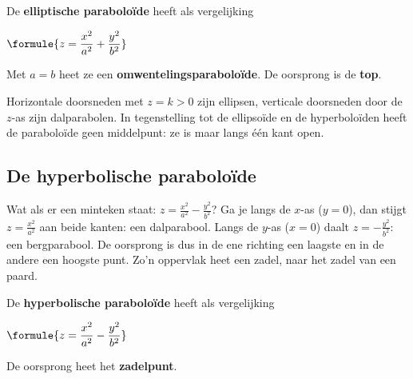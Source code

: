 \begin{theorie}
\begin{minipage}[t]{.68\linewidth}
\vspace{0pt}
De \textbf{\textcolor{accent}{elliptische paraboloïde}} heeft als vergelijking

\vspace{1mm}
\qquad $\formule{z = \dfrac{x^2}{a^2} + \dfrac{y^2}{b^2}}$

\vspace{1mm}
Met $a = b$ heet ze een \textbf{\textcolor{accent}{omwentelingsparaboloïde}}. De oorsprong is de \textbf{\textcolor{accent}{top}}.
\end{minipage}\hfill
\begin{minipage}[t]{.28\linewidth}
\vspace{0pt}
\centering
{}
\end{minipage}
\end{theorie}

Horizontale doorsneden met $z = k > 0$ zijn ellipsen, verticale doorsneden door de $z$-as zijn dalparabolen. In tegenstelling tot de ellipsoïde en de hyperboloïden heeft de paraboloïde geen middelpunt: ze is maar langs één kant open.

\subsection{De hyperbolische paraboloïde}

Wat als er een minteken staat: $z = \tfrac{x^2}{a^2} - \tfrac{y^2}{b^2}$? Ga je langs de $x$-as ($y = 0$), dan stijgt $z = \tfrac{x^2}{a^2}$ aan beide kanten: een dalparabool. Langs de $y$-as ($x = 0$) daalt $z = -\tfrac{y^2}{b^2}$: een bergparabool. De oorsprong is dus in de ene richting een laagste en in de andere een hoogste punt. Zo'n oppervlak heet een zadel, naar het zadel van een paard.

\begin{theorie}
\begin{minipage}[t]{.68\linewidth}
\vspace{0pt}
De \textbf{\textcolor{accent}{hyperbolische paraboloïde}} heeft als vergelijking

\vspace{1mm}
\qquad $\formule{z = \dfrac{x^2}{a^2} - \dfrac{y^2}{b^2}}$

\vspace{1mm}
De oorsprong heet het \textbf{\textcolor{accent}{zadelpunt}}.
\end{minipage}\hfill
\begin{minipage}[t]{.28\linewidth}
\vspace{0pt}
\centering
{}
\end{minipage}
\end{theorie}

